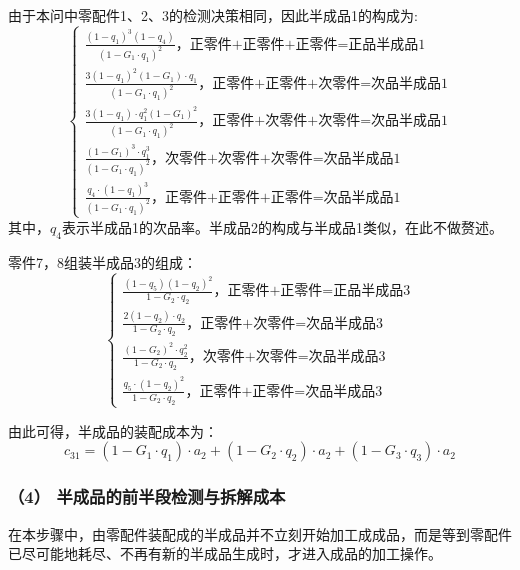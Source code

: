 \documentclass[withoutpreface,bwprint]{cumcmthesis} %
\begin{document}
由于本问中零配件1、2、3的检测决策相同，因此半成品1的构成为:
\begin{equation}
	\left\{\begin{array}{l}
		\frac{\left(1-q_1\right)^3\left(1-q_4\right)}{\left(1-G_1 \cdot q_1\right)^2} \text{，正零件+正零件+正零件=正品半成品1}\\
		\frac{3\left(1-q_1\right)^2\left(1-G_1\right) \cdot q_1}{\left(1-G_1 \cdot q_1\right)^2} \text{，正零件+正零件+次零件=次品半成品1}\\
		\frac{3\left(1-q_1\right) \cdot q_1^2\left(1-G_1\right)^2}{\left(1-G_1 \cdot q_1\right)^2} \text{，正零件+次零件+次零件=次品半成品1}\\
		\frac{\left(1-G_1\right)^3 \cdot q_1^3}{\left(1-G_1 \cdot q_1\right)^2}\text{，次零件+次零件+次零件=次品半成品1}\\
		\frac{q_4 \cdot\left(1-q_1\right)^3}{\left(1-G_1 \cdot q_1\right)^2}\text{，正零件+正零件+正零件=次品半成品1}
	\end{array}\right.
\end{equation}
其中，$q_4$表示半成品1的次品率。半成品2的构成与半成品1类似，在此不做赘述。

零件7，8组装半成品3的组成：
\begin{equation}
	\left\{\begin{array}{l}
		\frac{\left(1-q_5\right)\left(1-q_2\right)^2}{1-G_2 \cdot q_2} \text{，正零件+正零件=正品半成品3}\\
		\frac{2\left(1-q_2\right) \cdot q_2}{1-G_2 \cdot q_2} \text{，正零件+次零件=次品半成品3}\\
		\frac{\left(1-G_2\right)^2 \cdot q_2^2}{1-G_2 \cdot q_2} \text{，次零件+次零件=次品半成品3}\\
		\frac{q_5 \cdot\left(1-q_2\right)^2}{1-G_2 \cdot q_2}\text{，正零件+正零件=次品半成品3}
	\end{array}\right.
\end{equation}

由此可得，半成品的装配成本为：
\begin{equation}
	c_{31}=\left(1-G_1 \cdot q_1\right) \cdot a_2+\left(1-G_2 \cdot q_2\right) \cdot a_2+\left(1-G_3 \cdot q_3\right) \cdot a_2
\end{equation}

\subsubsection*{（4） 半成品的前半段检测与拆解成本}
在本步骤中，由零配件装配成的半成品并不立刻开始加工成成品，而是等到零配件已尽可能地耗尽、不再有新的半成品生成时，才进入成品的加工操作。
\end{document}
